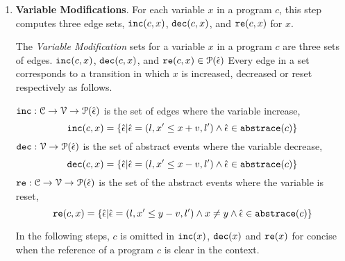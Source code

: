 \begin{enumerate}
\item \textbf{Variable Modifications}.
For each variable $x$ in a program $c$, this step computes three edge sets, $\mathtt{inc}(c, x)$, $\mathtt{dec}(c, x)$,
 and $\mathtt{re}(c, x)$ for $x$.
 \begin{defn}
 \label{def:var_modification}
 The \emph{Variable Modification} sets for a variable $x$ in a program $c$ are three sets of edges.
 $\mathtt{inc}(c, x)$, $\mathtt{dec}(c, x)$,
 and $\mathtt{re}(c, x) \in \mathcal{P}(\hat{\mathtt{\epsilon}{}})$
 Every edge in a set corresponds to a transition in which $x$ is increased,
 decreased
 or reset
 respectively as follows.
 
 $\mathtt{inc}: \mathcal{C} \to \mathcal{V} \to \mathcal{P}(\hat{\mathtt{\epsilon}{}}) $
 is the set of edges where the variable increase, 
 \[ \inc(c, x) = \left\{ \absevent | \absevent = (l, x' \leq x + v, l') \land \absevent \in \absflow(c) \right\} \]
 $\mathtt{dec}: \mathcal{V} \to \mathcal{P}(\hat{\mathtt{\epsilon}{}}) $
 is the set of abstract events where the variable decrease,
 \[\dec(c, x) = \left\{\absevent| \absevent = (l, x' \leq x - v, l') \land \absevent \in \absflow(c) \right\}\]
 $\mathtt{re}: \mathcal{C} \to \mathcal{V} \to \mathcal{P}(\hat{\mathtt{\epsilon}{}}) $ is the set of the abstract events where the variable is reset,
%
 \[\reset(c, x) = \left\{ \absevent| \absevent = (l, x' \leq y - v, l') \land x \neq y \land \absevent \in \absflow(c) \right\}\]
 \end{defn}
 In the following steps, $c$ is omitted in $\mathtt{inc}(x)$,
$\mathtt{dec}(x)$ and $\mathtt{re}(x)$ for concise when the reference of a program $c$ is clear in the context.


\end{enumerate}
